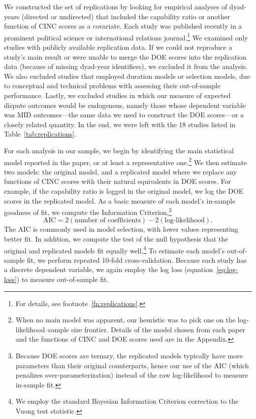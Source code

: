 We constructed the set of replications by looking for empirical analyses of dyad-years (directed or undirected) that included the capability ratio or another function of CINC scores as a covariate.
Each study was published recently in a prominent political science or international relations journal.\footnote{
  For details, see footnote~\ref{fn:replications}.
}
We examined only studies with publicly available replication data.
If we could not reproduce a study's main result or were unable to merge the DOE scores into the replication data (because of missing dyad-year identifiers), we excluded it from the analysis.
We also excluded studies that employed duration models or selection models, due to conceptual and technical problems with assessing their out-of-sample performance.
Lastly, we excluded studies in which our measure of expected dispute outcomes would be endogenous, namely those whose dependent variable was MID outcomes---the same data we used to construct the DOE scores---or a closely related quantity.
In the end, we were left with the 18 studies listed in Table~\ref{tab:replications}.

For each analysis in our sample, we begin by identifying the main statistical model reported in the paper, or at least a representative one.\footnote{
  When no main model was apparent, our heuristic was to pick one on the log-likelihood--sample size frontier.
  Details of the model chosen from each paper and the functions of CINC and DOE scores used are in the Appendix.
}
We then estimate two models: the original model, and a replicated model where we replace any functions of CINC scores with their natural equivalents in DOE scores.
For example, if the capability ratio is logged in the original model, we log the DOE scores in the replicated model.
As a basic measure of each model's in-sample goodness of fit, we compute the \citet{Akaike:1974ih} Information Criterion,\footnote{
  Because DOE scores are ternary, the replicated models typically have more parameters than their original counterparts, hence our use of the AIC (which penalizes over-parameterization) instead of the raw log-likelihood to measure in-sample fit.
}
\begin{displaymath}
  \text{AIC}
  =
  2(\text{number of coefficients}) - 2(\text{log-likelihood}).
\end{displaymath}
The AIC is commonly used in model selection, with lower values representing better fit.
In addition, we compute the \citet{Vuong:1989uf} test of the null hypothesis that the original and replicated models fit equally well.\footnote{
  We employ the standard Bayesian Information Criterion \citep{Schwarz:1978kh} correction to the Vuong test statistic.
}
To estimate each model's out-of-sample fit, we perform repeated 10-fold cross-validation.
Because each study has a discrete dependent variable, we again employ the log loss (equation~\eqref{eq:log-loss}) to measure out-of-sample fit.

